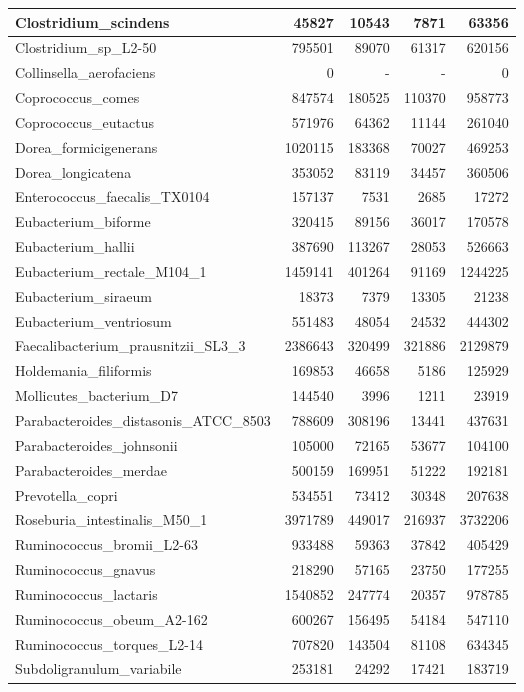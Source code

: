\documentclass[12pt,a4paper]{article}
\begin{document}
\begin{table}[ht]
\begin{center}
\begin{tabular}{|l*{4}{|r}|}
Clostridium\_scindens & 45827 & 10543 & 7871 & 63356 \\ \hline
Clostridium\_sp\_L2-50 & 795501 & 89070 & 61317 & 620156 \\ \hline
Collinsella\_aerofaciens & 0 & - & - & 0 \\ \hline
Coprococcus\_comes & 847574 & 180525 & 110370 & 958773 \\ \hline
Coprococcus\_eutactus & 571976 & 64362 & 11144 & 261040 \\ \hline
Dorea\_formicigenerans & 1020115 & 183368 & 70027 & 469253 \\ \hline
Dorea\_longicatena & 353052 & 83119 & 34457 & 360506 \\ \hline
Enterococcus\_faecalis\_TX0104 & 157137 & 7531 & 2685 & 17272 \\ \hline
Eubacterium\_biforme & 320415 & 89156 & 36017 & 170578 \\ \hline
Eubacterium\_hallii & 387690 & 113267 & 28053 & 526663 \\ \hline
Eubacterium\_rectale\_M104\_1 & 1459141 & 401264 & 91169 & 1244225 \\ \hline
Eubacterium\_siraeum & 18373 & 7379 & 13305 & 21238 \\ \hline
Eubacterium\_ventriosum & 551483 & 48054 & 24532 & 444302 \\ \hline
Faecalibacterium\_prausnitzii\_SL3\_3 & 2386643 & 320499 & 321886 & 2129879 \\ \hline
Holdemania\_filiformis & 169853 & 46658 & 5186 & 125929 \\ \hline
Mollicutes\_bacterium\_D7 & 144540 & 3996 & 1211 & 23919 \\ \hline
Parabacteroides\_distasonis\_ATCC\_8503 & 788609 & 308196 & 13441 & 437631 \\ \hline
Parabacteroides\_johnsonii & 105000 & 72165 & 53677 & 104100 \\ \hline
Parabacteroides\_merdae & 500159 & 169951 & 51222 & 192181 \\ \hline
Prevotella\_copri & 534551 & 73412 & 30348 & 207638 \\ \hline
Roseburia\_intestinalis\_M50\_1 & 3971789 & 449017 & 216937 & 3732206 \\ \hline
Ruminococcus\_bromii\_L2-63 & 933488 & 59363 & 37842 & 405429 \\ \hline
Ruminococcus\_gnavus & 218290 & 57165 & 23750 & 177255 \\ \hline
Ruminococcus\_lactaris & 1540852 & 247774 & 20357 & 978785 \\ \hline
Ruminococcus\_obeum\_A2-162 & 600267 & 156495 & 54184 & 547110 \\ \hline
Ruminococcus\_torques\_L2-14 & 707820 & 143504 & 81108 & 634345 \\ \hline
Subdoligranulum\_variabile & 253181 & 24292 & 17421 & 183719 \\ \hline
\end{tabular}
\end{center}
\end{table}
\end{document}
